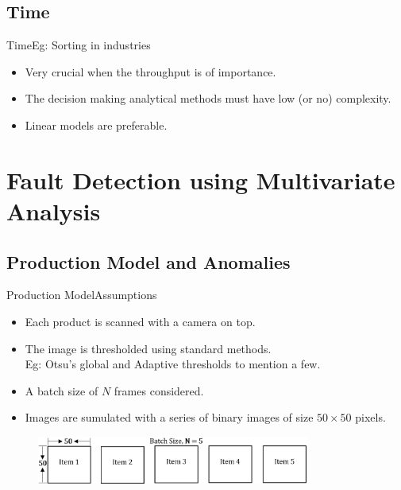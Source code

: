 \documentclass{beamer}
\begin{document}
\subsection{Time}

\begin{frame}{Time}{Eg: Sorting in industries}
  \begin{itemize}
  \item Very crucial when the throughput is of importance.
  \item The decision making analytical methods must have low (or no) complexity.
  \item Linear models are preferable.
  \end{itemize}
\end{frame}


\section{Fault Detection using Multivariate Analysis}

\subsection{Production Model and Anomalies}

\begin{frame}{Production Model}{Assumptions}
  \begin{itemize}
    \item Each product is scanned with a camera on top.
    \item The image is thresholded using standard methods. \\
    Eg: Otsu's global and Adaptive thresholds to mention a few.
    \item A batch size of $N$ frames considered.
    \item Images are sumulated with a series of binary images of size $50\times50$ pixels.
  \end{itemize}
  \begin{figure}
    \includegraphics[width=0.8\textwidth]{model}
  \end{figure}
\end{frame}
\end{document}
